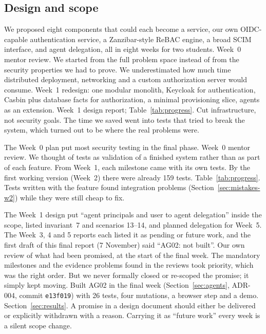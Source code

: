 \subsection{Design and scope}
\label{sec:mistakes-design}

{We proposed eight components that could each become a service, our own OIDC-capable authentication service, a Zanzibar-style ReBAC engine, a broad SCIM interface, and agent delegation, all in eight weeks for two students.}
{Week~0 mentor review.}
{We started from the full problem space instead of from the security properties we had to prove. We underestimated how much time distributed deployment, networking and a custom authorization server would consume.}
{Week~1 redesign: one modular monolith, Keycloak for authentication, Casbin plus database facts for authorization, a minimal provisioning slice, agents as an extension.}
{Week~1 design report; Table~\ref{tab:progress}.}
{Cut infrastructure, not security goals. The time we saved went into tests that tried to break the system, which turned out to be where the real problems were.}

{The Week~0 plan put most security testing in the final phase.}
{Week~0 mentor review.}
{We thought of tests as validation of a finished system rather than as part of each feature.}
{From Week~1, each milestone came with its own tests. By the first working version (Week~2) there were already 159 tests.}
{Table~\ref{tab:progress}.}
{Tests written with the feature found integration problems (Section~\ref{sec:mistakes-w2}) while they were still cheap to fix.}

{The Week~1 design put ``agent principals and user to agent delegation'' inside the scope, listed invariant~7 and scenarios 13--14, and planned delegation for Week~5. The Week~3, 4 and 5 reports each listed it as pending or future work, and the first draft of this final report (7 November) said ``AG02: not built''.}
{Our own review of what had been promised, at the start of the final week.}
{The mandatory milestones and the evidence problems found in the reviews took priority, which was the right order. But we never formally closed or re-scoped the promise; it simply kept moving.}
{Built AG02 in the final week (Section~\ref{sec:agents}, ADR-004, commit \texttt{e13f019}) with 26 tests, four mutations, a browser step and a demo.}
{Section~\ref{sec:results}.}
{A promise in a design document should either be delivered or explicitly withdrawn with a reason. Carrying it as ``future work'' every week is a silent scope change.}


